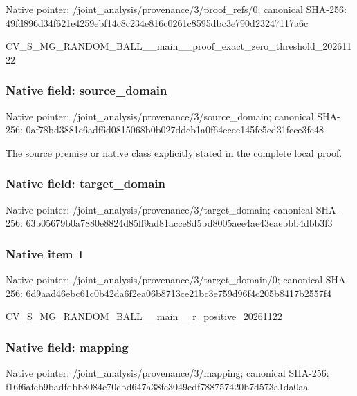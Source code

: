 \documentclass[10pt,a4paper]{article}
\begin{document}
Native pointer: /joint\_analysis/provenan\allowbreak{}ce/3/proof\_refs/0; canonical SHA-256: 49fd896d34f621e4259ebf14\allowbreak{}c8c234e816c0261c8595dbc3\allowbreak{}e790d23247117a6c


CV\_S\_MG\_RANDOM\_BALL\_\_mai\allowbreak{}n\_\_proof\_exact\_zero\_thre\allowbreak{}shold\_20261122


\subsubsection{Native field: source\_domain}


Native pointer: /joint\_analysis/provenan\allowbreak{}ce/3/source\_domain; canonical SHA-256: 0af78bd3881e6adf6d081506\allowbreak{}8b0b027ddcb1a0f64ecee145\allowbreak{}fc5cd31fece3fe48


The source premise or native class explicitly stated in the complete local proof.


\subsubsection{Native field: target\_domain}


Native pointer: /joint\_analysis/provenan\allowbreak{}ce/3/target\_domain; canonical SHA-256: 63b05679b0a7880e8824d85f\allowbreak{}f9ad81acce8d5bd8005aee4a\allowbreak{}e43eaebbb4dbb3f3



\subsubsection{Native item 1}


Native pointer: /joint\_analysis/provenan\allowbreak{}ce/3/target\_domain/0; canonical SHA-256: 6d9aad46ebc61c0b42da6f2e\allowbreak{}a06b8713ce21bc3e759d96f4\allowbreak{}c205b8417b2557f4


CV\_S\_MG\_RANDOM\_BALL\_\_mai\allowbreak{}n\_\_r\_positive\_20261122


\subsubsection{Native field: mapping}


Native pointer: /joint\_analysis/provenance/3/mapping; canonical SHA-256: f16f6afeb9badfdbb8084c70\allowbreak{}cbd647a38fc3049edf788757\allowbreak{}420b7d573a1da0aa
\end{document}
